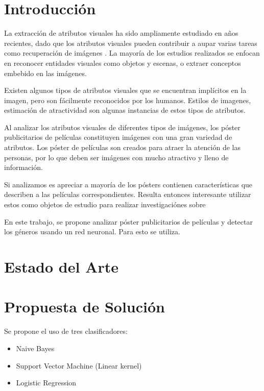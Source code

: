 \documentclass[runningheads,a4paper]{llncs}
\begin{document}
\section{Introducci\'on}

La extracci\'on de atributos visuales ha sido ampliamente estudiado en a\~nos recientes, dado que los atributos visuales pueden contribuir a aupar varias tareas como recuperaci\'on de im\'agenes \cite{fourteen}. La mayor\'ia de los estudios realizados se enfocan en reconocer entidades visuales como objetos y escenas, o extraer conceptos embebido en las im\'agenes.

Existen algunos tipos de atributos visuales que se encuentran impl\'icitos en la imagen, pero son f\'acilmente reconocidos por los humanos. Estilos de imagenes\cite{four}, estimaci\'on de atractividad son algunas instancias de estos tipos de atributos.

Al analizar los atributos visuales de diferentes tipos de im\'agenes, los p\'oster publicitarios de pel\'iculas constituyen im\'agenes con una gran variedad de atributos. Los p\'oster de pel\'iculas son creados para atraer la atenci\'on de las personas, por lo que deben ser im\'agenes con mucho atractivo y lleno de informaci\'on.

Si analizamos es apreciar a mayor\'ia de los p\'osters contienen caracter\'isticas que describen a las pel\'iculas correspondientes. Resulta entonces interesante utilizar estos como objetos de estudio para realizar investigaci\'ones sobre 

En este trabajo, se propone analizar p\'oster publicitarios de pel\'iculas y detectar los g\'eneros usando un red neuronal. Para esto se utiliza.

\section{Estado del Arte}

\section{Propuesta de Soluci\'on}
	Se propone el uso de tres clasificadores:
	\begin{itemize}
		\item Naive Bayes \cite{}
		\item Support Vector Machine (Linear kernel) \cite{}
		\item Logistic Regression \cite{}
	\end{itemize}
\end{document}
